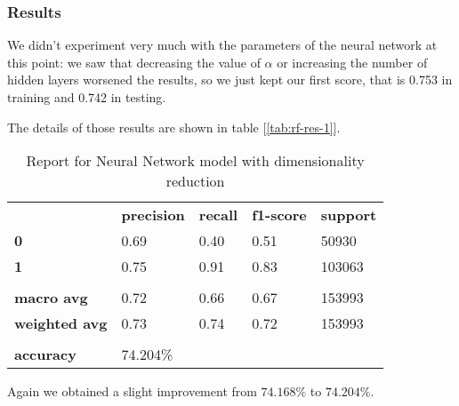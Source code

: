 \subsubsection{Results}

We didn't experiment very much with the parameters of the neural network at this point: we saw that decreasing the value of $\alpha$ or increasing the number of hidden layers worsened the results, so we just kept our first score, that is 0.753 in training and 0.742 in testing.

The details of those results are shown in table [\ref{tab:rf-res-1}].

\newpage %

\begin{table}[h!]
    \centering
    \begin{tabular}{lllll}
        \rowcolor[HTML]{EEEEEE} 
        \cellcolor[HTML]{FBFBFB} & \textbf{precision} & \textbf{recall} & \textbf{f1-score} & \textbf{support} \\
        \rowcolor[HTML]{EEEEEE} 
        \textbf{0}               & 0.69               & 0.40            & 0.51              & 50930            \\
        \rowcolor[HTML]{EEEEEE} 
        \textbf{1}               & 0.75               & 0.91            & 0.83              & 103063           \\
        \rowcolor[HTML]{FBFBFB} 
        &                    &                 &                   &                  \\
        \rowcolor[HTML]{EEEEEE} 
        \textbf{macro avg}       & 0.72               & 0.66            & 0.67              & 153993           \\
        \rowcolor[HTML]{EEEEEE} 
        \textbf{weighted avg}    & 0.73               & 0.74            & 0.72              & 153993           \\
        \rowcolor[HTML]{FBFBFB} 
        &                    &                 &                   &                  \\
        \rowcolor[HTML]{EEEEEE} 
        \textbf{accuracy}        & \multicolumn{4}{l}{\cellcolor[HTML]{EEEEEE}74.204\%}                         
    \end{tabular}
    \caption{Report for Neural Network model with dimensionality reduction}
    \label{tab:nn-res-1}
\end{table}

Again we obtained a slight improvement from $74.168\%$ to $74.204\%$.
